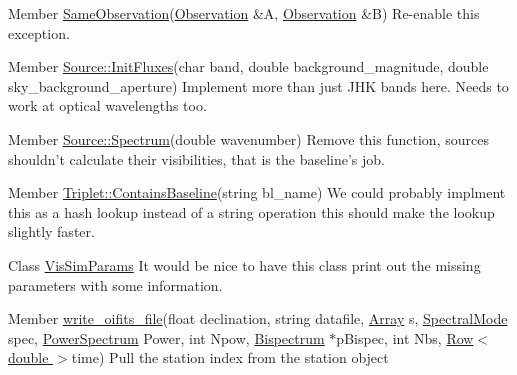 \label{todo__todo000010}
\hypertarget{todo__todo000010}{}
 
\begin{DoxyDescription}
\item[Member \hyperlink{Observation_8cpp_a7b3b1fd442e24f879e0ecb8d83322aba}{SameObservation}(\hyperlink{classObservation}{Observation} \&A, \hyperlink{classObservation}{Observation} \&B) ]Re-\/enable this exception. 
\end{DoxyDescription}

\label{todo__todo000012}
\hypertarget{todo__todo000012}{}
 
\begin{DoxyDescription}
\item[Member \hyperlink{classSource_a6ddbe3353cd4d57bcad7010c70a1b06c}{Source::InitFluxes}(char band, double background\_\-magnitude, double sky\_\-background\_\-aperture) ]Implement more than just JHK bands here. Needs to work at optical wavelengths too. 
\end{DoxyDescription}

\label{todo__todo000013}
\hypertarget{todo__todo000013}{}
 
\begin{DoxyDescription}
\item[Member \hyperlink{classSource_a1b9f408aa6c5dcd5550e9cb28922e3af}{Source::Spectrum}(double wavenumber) ]Remove this function, sources shouldn't calculate their visibilities, that is the baseline's job. 
\end{DoxyDescription}

\label{todo__todo000014}
\hypertarget{todo__todo000014}{}
 
\begin{DoxyDescription}
\item[Member \hyperlink{classTriplet_a1ca8200db446ed4018debea8ff3cfd2e}{Triplet::ContainsBaseline}(string bl\_\-name) ]We could probably implment this as a hash lookup instead of a string operation this should make the lookup slightly faster. 
\end{DoxyDescription}

\label{todo__todo000020}
\hypertarget{todo__todo000020}{}
 
\begin{DoxyDescription}
\item[Class \hyperlink{classVisSimParams}{VisSimParams} ]It would be nice to have this class print out the missing parameters with some information. 
\end{DoxyDescription}

\label{todo__todo000016}
\hypertarget{todo__todo000016}{}
 
\begin{DoxyDescription}
\item[Member \hyperlink{oifits__sim_8cpp_af7f7af2a9a20b52d3e4fd0ebc9186039}{write\_\-oifits\_\-file}(float declination, string datafile, \hyperlink{classArray}{Array} s, \hyperlink{classSpectralMode}{SpectralMode} spec, \hyperlink{classPowerSpectrum}{PowerSpectrum} Power, int Npow, \hyperlink{classBispectrum}{Bispectrum} $\ast$pBispec, int Nbs, \hyperlink{classRow}{Row$<$ double $>$}time) ]Pull the station index from the station object 
\end{DoxyDescription}